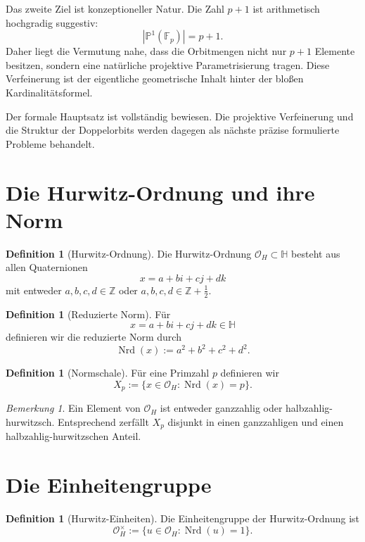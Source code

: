 \documentclass[12pt,a4paper]{article}
\theoremstyle{plain}
\theoremstyle{definition}
\newtheorem{definition}[satz]{Definition}
\theoremstyle{remark}
\newtheorem{bemerkung}[satz]{Bemerkung}
\newcommand{\OH}{\mathcal O_H}
\newcommand{\QH}{\mathbb H}
\newcommand{\Z}{\mathbb Z}
\newcommand{\Fp}{\mathbb F_p}
\newcommand{\PP}{\mathbb P}
\newcommand{\nrd}{\operatorname{Nrd}}
\begin{document}
	Das zweite Ziel ist konzeptioneller Natur. Die Zahl \(p+1\) ist arithmetisch hochgradig suggestiv:
	\[
	|\PP^1(\Fp)|=p+1.
	\]
	Daher liegt die Vermutung nahe, dass die Orbitmengen nicht nur \(p+1\) Elemente besitzen, sondern eine natürliche projektive Parametrisierung tragen. Diese Verfeinerung ist der eigentliche geometrische Inhalt hinter der bloßen Kardinalitätsformel.
	
	Der formale Hauptsatz ist vollständig bewiesen. Die projektive Verfeinerung und die Struktur der Doppelorbits werden dagegen als nächste präzise formulierte Probleme behandelt.
	
	\section{Die Hurwitz-Ordnung und ihre Norm}
	
	\begin{definition}[Hurwitz-Ordnung]
		Die Hurwitz-Ordnung \(\OH\subset \QH\) besteht aus allen Quaternionen
		\[
		x=a+bi+cj+dk
		\]
		mit entweder \(a,b,c,d\in\Z\) oder \(a,b,c,d\in\Z+\tfrac12\).
	\end{definition}
	
	\begin{definition}[Reduzierte Norm]
		Für
		\[
		x=a+bi+cj+dk\in\QH
		\]
		definieren wir die reduzierte Norm durch
		\[
		\nrd(x):=a^2+b^2+c^2+d^2.
		\]
	\end{definition}
	
	\begin{definition}[Normschale]
		Für eine Primzahl \(p\) definieren wir
		\[
		X_p:=\{x\in\OH:\nrd(x)=p\}.
		\]
	\end{definition}
	
	\begin{bemerkung}
		Ein Element von \(\OH\) ist entweder ganzzahlig oder halbzahlig-hurwitzsch. Entsprechend zerfällt \(X_p\) disjunkt in einen ganzzahligen und einen halbzahlig-hurwitzschen Anteil.
	\end{bemerkung}
	
	\section{Die Einheitengruppe}
	
	\begin{definition}[Hurwitz-Einheiten]
		Die Einheitengruppe der Hurwitz-Ordnung ist
		\[
		\OH^\times:=\{u\in\OH:\nrd(u)=1\}.
		\]
	\end{definition}
	
\end{document}
